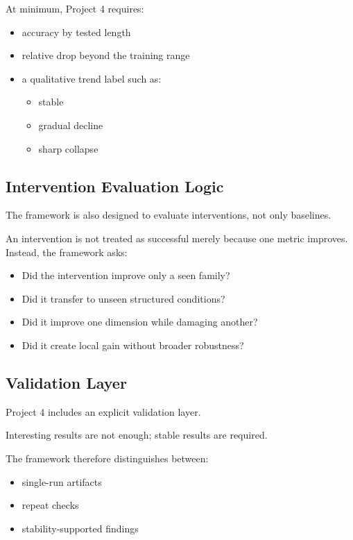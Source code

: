 \documentclass[11pt]{article}
\begin{document}
At minimum, Project 4 requires:
\begin{itemize}[leftmargin=1.5em]
    \item accuracy by tested length
    \item relative drop beyond the training range
    \item a qualitative trend label such as:
    \begin{itemize}[leftmargin=1.5em]
        \item stable
        \item gradual decline
        \item sharp collapse
    \end{itemize}
\end{itemize}

\subsection{Intervention Evaluation Logic}

The framework is also designed to evaluate interventions, not only baselines.

An intervention is not treated as successful merely because one metric improves. Instead, the framework asks:
\begin{itemize}[leftmargin=1.5em]
    \item Did the intervention improve only a seen family?
    \item Did it transfer to unseen structured conditions?
    \item Did it improve one dimension while damaging another?
    \item Did it create local gain without broader robustness?
\end{itemize}

\subsection{Validation Layer}

Project 4 includes an explicit validation layer.

Interesting results are not enough; stable results are required.

The framework therefore distinguishes between:
\begin{itemize}[leftmargin=1.5em]
    \item single-run artifacts
    \item repeat checks
    \item stability-supported findings
\end{itemize}
\end{document}
